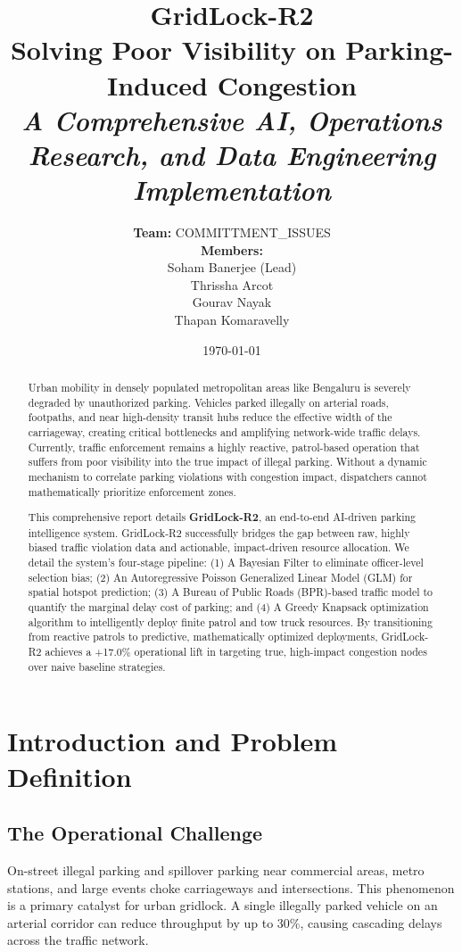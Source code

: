 \documentclass[12pt,a4paper]{article}
\title{
    \vspace{-1.5cm}
    \textbf{\Huge GridLock-R2}\\
    \vspace{0.2cm}
    \textbf{\LARGE Solving Poor Visibility on Parking-Induced Congestion}\\
    \vspace{0.5cm}
    \large \textit{A Comprehensive AI, Operations Research, and Data Engineering Implementation}\\
    \vspace{0.5cm}
}
\author{
    \textbf{Team:} COMMITTMENT\_ISSUES \\
    \textbf{Members:} \\
    Soham Banerjee (Lead) \\
    Thrissha Arcot \\
    Gourav Nayak \\
    Thapan Komaravelly
}
\date{\today}
\begin{document}
\maketitle
\thispagestyle{empty}

\begin{abstract}
    Urban mobility in densely populated metropolitan areas like Bengaluru is severely degraded by unauthorized parking. Vehicles parked illegally on arterial roads, footpaths, and near high-density transit hubs reduce the effective width of the carriageway, creating critical bottlenecks and amplifying network-wide traffic delays. Currently, traffic enforcement remains a highly reactive, patrol-based operation that suffers from poor visibility into the true impact of illegal parking. Without a dynamic mechanism to correlate parking violations with congestion impact, dispatchers cannot mathematically prioritize enforcement zones. 

    This comprehensive report details \textbf{GridLock-R2}, an end-to-end AI-driven parking intelligence system. GridLock-R2 successfully bridges the gap between raw, highly biased traffic violation data and actionable, impact-driven resource allocation. We detail the system's four-stage pipeline: (1) A Bayesian Filter to eliminate officer-level selection bias; (2) An Autoregressive Poisson Generalized Linear Model (GLM) for spatial hotspot prediction; (3) A Bureau of Public Roads (BPR)-based traffic model to quantify the marginal delay cost of parking; and (4) A Greedy Knapsack optimization algorithm to intelligently deploy finite patrol and tow truck resources. By transitioning from reactive patrols to predictive, mathematically optimized deployments, GridLock-R2 achieves a +17.0\% operational lift in targeting true, high-impact congestion nodes over naive baseline strategies.
\end{abstract}

\newpage
\tableofcontents
\newpage

\section{Introduction and Problem Definition}

\subsection{The Operational Challenge}
On-street illegal parking and spillover parking near commercial areas, metro stations, and large events choke carriageways and intersections. This phenomenon is a primary catalyst for urban gridlock. A single illegally parked vehicle on an arterial corridor can reduce throughput by up to 30\%, causing cascading delays across the traffic network. 
\end{document}
